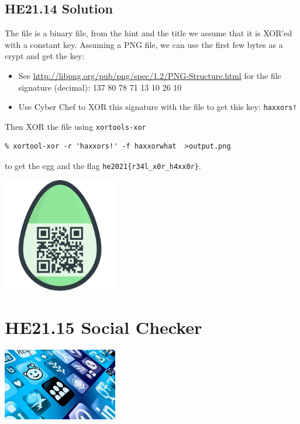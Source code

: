 \documentclass[english,a4paper,nols,noindent]{tufte-handout}
\begin{document}
\hypertarget{he21.14-solution}{%
\subsection{HE21.14 Solution}\label{he21.14-solution}}

\noindent The file is a binary file, from the hint and the title we assume that it is XOR'ed with a constant key.  Assuming a PNG file, we can use the first few bytes as a crypt and get the key:
\begin{itemize}
\item See \url{http://libpng.org/pub/png/spec/1.2/PNG-Structure.html} for the file signature (decimal): 137 80 78 71 13 10 26 10
  
\item Use Cyber Chef to XOR this signature with the file to get this key: \verb+haxxors!+
\end{itemize}

Then XOR the file using \verb+xortools-xor+

\begin{verbatim}
% xortool-xor -r 'haxxors!' -f haxxorwhat  >output.png 
\end{verbatim}

to get the egg and the flag
\verb+he2021{r34l_x0r_h4xx0r}+.
\begin{marginfigure}
    \includegraphics[width=50mm]{ch14/output.png}
\end{marginfigure}

\hypertarget{he21.15}{%
  \section{HE21.15 Social Checker}
  \label{he21.15}}
\begin{marginfigure}
    \includegraphics[width=50mm]{images/challenge15.jpg}
\end{marginfigure}
\end{document}
